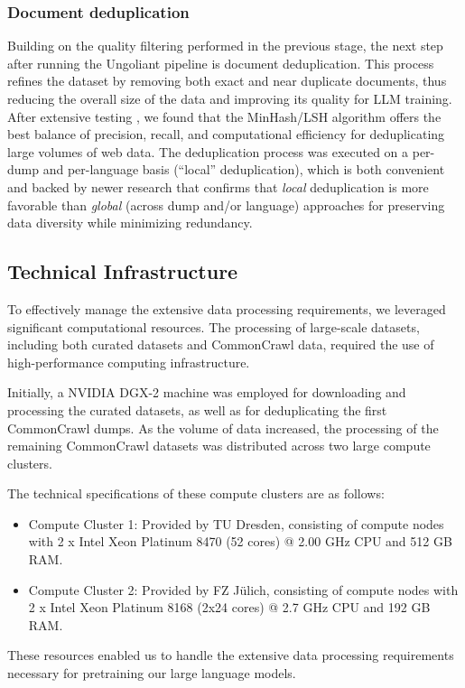 \subsubsection{Document deduplication}
\label{sec:pipelines.web.dedup}


Building on the quality filtering performed in the previous stage, the next step after running the Ungoliant pipeline is document deduplication. This process refines the dataset by removing both exact and near duplicate documents, thus reducing the overall size of the data and improving its quality for LLM training.
After extensive testing \cite{leveling_helmer_etal2024}, we found that the MinHash/LSH algorithm offers the best balance of precision, recall, and computational efficiency for deduplicating large volumes of web data. The deduplication process was executed on a per-dump and per-language basis (``local'' deduplication), which is both convenient and backed by newer research \cite{penedo_kydlicek_etal2024} that confirms that \emph{local} deduplication is more favorable than \emph{global} (across dump and/or language) approaches for preserving data diversity while minimizing redundancy.


\subsection{Technical Infrastructure}
\label{sec:pipelines.infrastructure}

To  effectively manage the extensive data processing requirements, we leveraged significant computational resources. The processing of large-scale datasets, including both curated datasets and CommonCrawl data, required the use of high-performance computing infrastructure.

Initially, a NVIDIA DGX-2 machine was employed for downloading and processing the curated datasets, as well as for deduplicating the first CommonCrawl dumps. As the volume of data increased, the processing of the remaining CommonCrawl datasets was distributed across two large compute clusters.

The technical specifications of these compute clusters are as follows:

\begin{itemize}
    \item Compute Cluster 1: Provided by TU Dresden, consisting of compute nodes with 2 x Intel Xeon Platinum 8470 (52 cores) @ 2.00 GHz CPU and 512 GB RAM.
    \item Compute Cluster 2: Provided by FZ Jülich, consisting of compute nodes with 2 x Intel Xeon Platinum 8168 (2x24 cores) @ 2.7 GHz CPU and 192 GB RAM.
\end{itemize}

These resources enabled us to handle the extensive data processing requirements necessary for pretraining our large language models.




